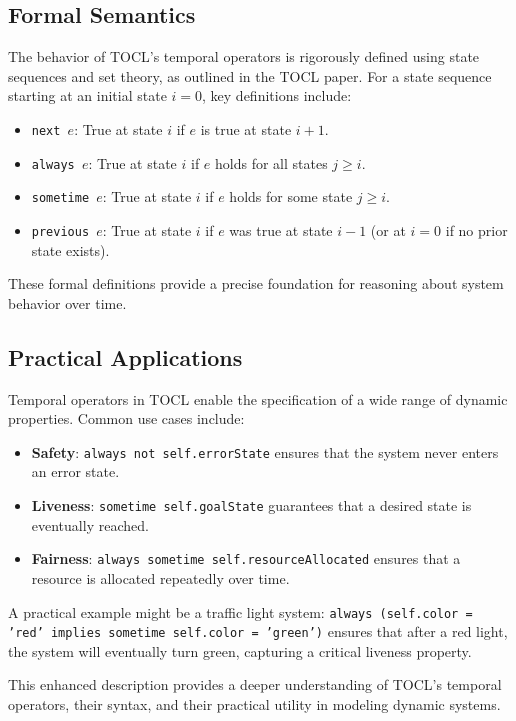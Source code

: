 \subsection*{Formal Semantics}
The behavior of TOCL’s temporal operators is rigorously defined using state sequences and set theory, as outlined in the TOCL paper. For a state sequence starting at an initial state $i = 0$, key definitions include:
\begin{itemize}
    \item \texttt{next $e$}: True at state $i$ if $e$ is true at state $i+1$.
    \item \texttt{always $e$}: True at state $i$ if $e$ holds for all states $j \geq i$.
    \item \texttt{sometime $e$}: True at state $i$ if $e$ holds for some state $j \geq i$.
    \item \texttt{previous $e$}: True at state $i$ if $e$ was true at state $i-1$ (or at $i = 0$ if no prior state exists).
\end{itemize}
These formal definitions provide a precise foundation for reasoning about system behavior over time.

\subsection*{Practical Applications}
Temporal operators in TOCL enable the specification of a wide range of dynamic properties. Common use cases include:
\begin{itemize}
    \item \textbf{Safety}: \texttt{always not self.errorState} ensures that the system never enters an error state.
    \item \textbf{Liveness}: \texttt{sometime self.goalState} guarantees that a desired state is eventually reached.
    \item \textbf{Fairness}: \texttt{always sometime self.resourceAllocated} ensures that a resource is allocated repeatedly over time.
\end{itemize}
A practical example might be a traffic light system: \texttt{always (self.color = 'red' implies sometime self.color = 'green')} ensures that after a red light, the system will eventually turn green, capturing a critical liveness property.

This enhanced description provides a deeper understanding of TOCL’s temporal operators, their syntax, and their practical utility in modeling dynamic systems.



